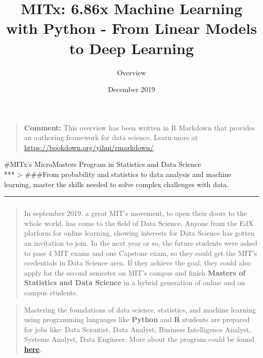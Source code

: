 \documentclass[]{article}
\title{MITx: 6.86x Machine Learning with Python - From Linear Models to Deep
Learning}
\subtitle{Overview}
\author{}
\date{\vspace{-2.5em}December 2019}
\begin{document}
\maketitle

\begin{quote}
\textbf{Comment:} This overview has been written in R Markdown that
provides an authoring framework for data science. Learn more at
\url{https://bookdown.org/yihui/rmarkdown/}
\end{quote}

\thispagestyle{empty}
\newpage


\#MITx's MicroMasters Program in Statistics and Data Science\\
*** \textgreater{} \#\#\#From probability and statistics to data
analysis and machine learning, master the skills needed to solve complex
challenges with data.

\begin{center}\rule{0.5\linewidth}{\linethickness}\end{center}

\hypertarget{section}{%
\subsubsection{}\label{section}}

\begin{quote}
In september 2019. a great MIT's movement, to open their doors to the
whole world, has come to the field of Data Science. Anyone from the EdX
platform for online learning, showing interests for Data Science has
gotten an invitation to join. In the next year or so, the future
students were asked to pass 4 MIT exams and one Capstone exam, so they
could get the MIT's credentials in Data Science area. If they achieve
the goal, they could also apply for the second semester on MIT's campus
and finish \textbf{Masters of Statistics and Data Science} in a hybrid
generation of online and on campus students.
\end{quote}

\begin{quote}
Mastering the foundations of data science, statistics, and machine
learning using programming languages like \textbf{Python} and \textbf{R}
students are prepared for jobs like: Data Scientist, Data Analyst,
Business Intelligence Analyst, Systems Analyst, Data Engineer. More
about the program could be found
\href{https://micromasters.mit.edu/ds/}{\textbf{here}}.
\end{quote}
\end{document}
